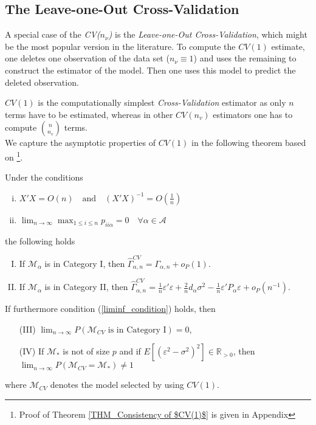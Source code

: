 \documentclass[Research_Module_ES.tex]{subfiles}
\begin{document}
\subsection{The Leave-one-Out Cross-Validation}
A special case of the \textit{CV($n_\nu$)} is the \textit{Leave-one-Out Cross-Validation}, which might be the most popular version in the literature.
To compute the $CV(1)$ estimate, one deletes one observation of the data set ($n_\nu\equiv1$) and uses the remaining to construct the estimator of the model. Then one uses this model to predict the
deleted observation.

$CV(1)$ is the computationally simplest \textit{Cross-Validation} estimator as only $n$ terms have to be estimated, whereas in other $CV(n_v)$ estimators one has to compute $\binom{n}{n_v}$ terms.\\

We capture the asymptotic properties of $CV(1)$ in the following theorem based on \cite{shao}\footnote{Proof of Theorem \ref{THM_Consistency of $CV(1)$} is given in Appendix }.

\begin{thm}
Under the conditions 
\label{THM_Consistency of $CV(1)$}
\begin{enumerate}[(i)]
\item $X'X = O(n) \quad \textrm{and} \quad (X'X)^{-1}=O(\frac{1}{n})$
\item $ \lim_{n \to \infty} \max_{1\le i\le n} p_{ii\alpha} =0 \quad \forall \alpha \in \mathcal{A} $ 
\end{enumerate}
the following holds
\begin{enumerate}[(I)]
\item If $\mathcal{M}_\alpha$ is in Category I, then $\hat{\Gamma}_{\alpha,n}^{CV} = \Gamma_{\alpha,n} + o_P(1)$.
\item If $\mathcal{M}_\alpha$ is in Category II, then $\hat{\Gamma}_{\alpha,n}^{CV} = \frac{1}{n}\varepsilon'\varepsilon + \frac{2}{n}d_\alpha\sigma^2 - \frac{1}{n}\varepsilon'P_\alpha\varepsilon + o_P(n^{-1})$.
\end{enumerate}
If furthermore condition (\ref{liminf_condition}) holds,
then 
\begin{enumerate}
\item[(III)] $\lim_{n\to\infty} P(\mathcal{M}_{CV}\textrm{ is in Category I})=0$,
\item[(IV)]If $\mathcal{M}_\ast$ is not of size $p$ and if $E[(\varepsilon^2-\sigma^2)^2]\in\mathbb{R}_{>0}$, then \\\mbox{$\lim_{n\to\infty}P(\mathcal{M}_{CV}=\mathcal{M}_\ast) \neq 1$}
\end{enumerate}
where $\mathcal{M}_{CV}$ denotes the model selected by using $CV(1)$.
\end{thm}
\end{document}
